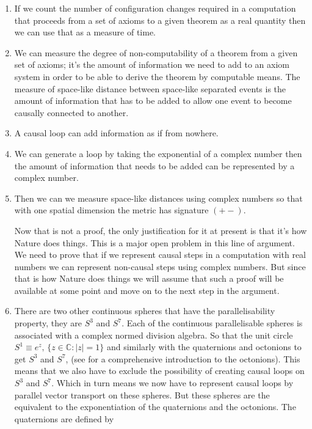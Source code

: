 \documentclass[
   ,final            %
  ]
  {aipproc}
\begin{document}
\begin{enumerate}[(1)]
\item
If we count the number of configuration changes required in a computation that proceeds from a set of axioms to a given theorem as a real quantity %
then we can use that as a measure of time. 
\item
We can measure the degree of non-computability of a theorem from a given set of axioms; it's the amount of information we need to add to an axiom %
system in order to be able to derive the theorem by computable means. The measure of space-like distance between space-like separated events is the %
amount of information that has to be added to allow one event to become causally connected to another.
\item
A causal loop can add information as if from nowhere.
\item
We can generate a loop by taking the exponential of a complex number then the amount of information that needs to be added can be represented by a %
complex number. 
\item
Then we can we measure space-like distances using complex numbers so that with one spatial dimension the metric has signature $(+-)$.
\par
Now that is not a proof, the only justification for it at present is that it's how Nature does things. This is a major open problem in this line of %
argument. We need to prove that if we represent causal steps in a computation with real numbers we can represent non-causal steps using complex %
numbers. But since that is how Nature does things we will assume that such a proof will be available at some point and move on to the next step in the %
argument. 
\item
There are two other continuous spheres that have the parallelisability property, they are $S^3$ and $S^7$. Each of the continuous parallelisable %
spheres is associated with a complex normed division algebra.  So that the unit circle $S^1 \equiv e^{z}\text{, } \{z \in \mathbb{C}:|z|=1 \}$ and %
similarly with the quaternions and octonions to get $S^3$ and $S^7$, (see \citet{baez_2002} for a comprehensive introduction to the octonions). This %
means that we also have to exclude the possibility of creating causal loops on $S^3$ and $S^7$. Which in turn means we now have to represent causal %
loops by parallel vector transport on these spheres. But these spheres are the equivalent to the exponentiation of the quaternions and the octonions. %
The quaternions are defined by
\begin{equation}

\end{equation}
\end{enumerate}
\end{document}

